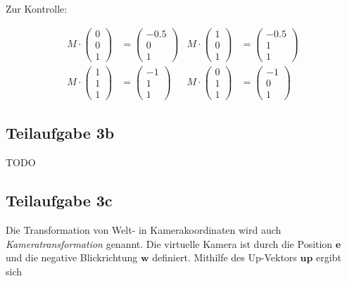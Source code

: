 \documentclass[a4paper]{scrartcl}
\begin{document}
Zur Kontrolle:

\begin{align}
    M \cdot \begin{pmatrix}0\\0\\1\end{pmatrix} &= \begin{pmatrix}-0.5\\0\\1\end{pmatrix}
    & M \cdot \begin{pmatrix}1\\0\\1\end{pmatrix} &= \begin{pmatrix}-0.5\\1\\1\end{pmatrix}\\
    M \cdot \begin{pmatrix}1\\1\\1\end{pmatrix} &= \begin{pmatrix}-1\\1\\1\end{pmatrix}
    & M \cdot \begin{pmatrix}0\\1\\1\end{pmatrix} &= \begin{pmatrix}-1\\0\\1\end{pmatrix}
\end{align}




\subsection*{Teilaufgabe 3b}
TODO

\subsection*{Teilaufgabe 3c}
Die Transformation von Welt- in Kamerakoordinaten wird auch
\textit{Kameratransformation} genannt. Die virtuelle Kamera ist durch die
Position $\mathbf{e}$ und die negative Blickrichtung $\mathbf{w}$ definiert.
Mithilfe des Up-Vektors $\mathbf{up}$ ergibt sich
\end{document}
